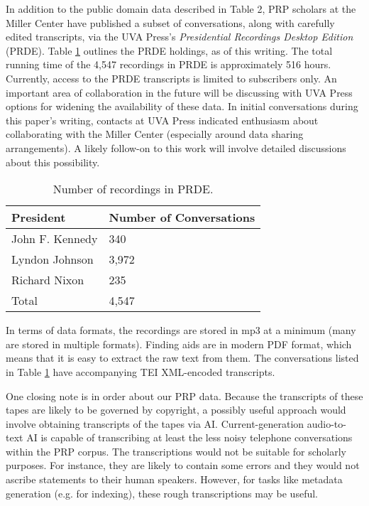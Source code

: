\documentclass[12pt, oneside]{article}   	%
\begin{document}
In addition to the public domain data described in Table 2, PRP scholars at the Miller Center have published a subset of conversations, along with carefully edited transcripts, via the UVA Press’s \emph{Presidential Recordings Desktop Edition} (PRDE).  Table \ref{table.data.prde} outlines the PRDE holdings, as of this writing.  The total running time of the 4,547 recordings in PRDE is approximately 516 hours.  Currently, access to the PRDE transcripts is limited to subscribers only.  An important area of collaboration in the future will be discussing with UVA Press options for widening the availability of these data.  In initial conversations during this paper's writing, contacts at UVA Press indicated enthusiasm about collaborating with the Miller Center (especially around data sharing arrangements).  A likely follow-on to this work will involve detailed discussions about this possibility. 


\begin{table}[htp]
\caption{Number of recordings in PRDE.}
\begin{center}
\begin{tabular}{ p{1.75in} p{2in}}
\toprule
President				&	Number of Conversations		\\
\midrule
 John F. Kennedy	 	& 	340 				\\
\midrule
 Lyndon Johnson	 	& 	3,972 				\\
\midrule
 Richard Nixon		 	& 	235			 \\
\bottomrule
Total					&	4,547		\\
\bottomrule
\end{tabular}
\end{center}
\label{table.data.prde}
\end{table}%

In terms of data formats, the recordings are stored in mp3 at a minimum (many are stored in multiple formats).  Finding aids are in modern PDF format, which means that it is easy to extract the raw text from them.  The conversations listed in Table \ref{table.data.prde} have accompanying TEI XML-encoded transcripts.  

One closing note is in order about our PRP data.  Because the transcripts of these tapes are likely to be governed by copyright, a possibly useful approach would involve obtaining transcripts of the tapes via AI.  Current-generation audio-to-text AI is capable of transcribing at least the less noisy telephone conversations within the PRP corpus.  The transcriptions would not be suitable for scholarly purposes.  For instance, they are likely to contain some errors and they would not ascribe statements to their human speakers.  However, for tasks like metadata generation (e.g. for indexing), these rough transcriptions may be useful.   
\end{document}
